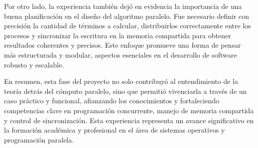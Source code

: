 {Por otro lado, la experiencia también dejó en evidencia la importancia de una buena planificación en el diseño del algoritmo paralelo. Fue necesario definir con precisión la cantidad de términos a calcular, distribuirlos correctamente entre los procesos y sincronizar la escritura en la memoria compartida para obtener resultados coherentes y precisos. Este enfoque promueve una forma de pensar más estructurada y modular, aspectos esenciales en el desarrollo de software robusto y escalable.

En resumen, esta fase del proyecto no solo contribuyó al entendimiento de la teoría detrás del cómputo paralelo, sino que permitió vivenciarla a través de un caso práctico y funcional, afianzando los conocimientos y fortaleciendo competencias clave en programación concurrente, manejo de memoria compartida y control de sincronización. Esta experiencia representa un avance significativo en la formación académica y profesional en el área de sistemas operativos y programación paralela.


}